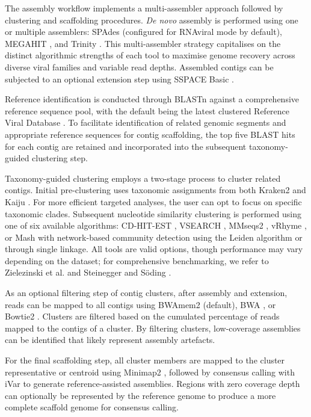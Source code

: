The assembly workflow implements a multi-assembler approach followed by clustering and scaffolding procedures. \textit{De novo} assembly is performed using one or multiple assemblers: SPAdes \cite{Meleshko2021-gb} (configured for RNAviral mode by default), MEGAHIT \cite{Li2016-sd}, and Trinity \cite{Grabherr2011-ef}. This multi-assembler strategy capitalises on the distinct algorithmic strengths of each tool to maximise genome recovery across diverse viral families and variable read depths. Assembled contigs can be subjected to an optional extension step using SSPACE Basic \cite{Boetzer2011-dh}.

Reference identification is conducted through BLASTn \cite{Altschul1990-sy} against a comprehensive reference sequence pool, with the default being the latest clustered Reference Viral Database \cite{Goodacre2018-dw}. To facilitate identification of related genomic segments and appropriate reference sequences for contig scaffolding, the top five BLAST hits for each contig are retained and incorporated into the subsequent taxonomy-guided clustering step.

Taxonomy-guided clustering employs a two-stage process to cluster related contigs. Initial pre-clustering uses taxonomic assignments from both Kraken2 \cite{Wood2019-jl} and Kaiju \cite{Menzel2016-tz}. For more efficient targeted analyses, the user can opt to focus on specific taxonomic clades. Subsequent nucleotide similarity clustering is performed using one of six available algorithms: CD-HIT-EST \cite{Li2006-nj}, VSEARCH \cite{Rognes2016-ju}, MMseqs2 \cite{Steinegger2017-ci}, vRhyme \cite{Kieft2022-km}, or Mash \cite{Ondov2019-bo} with network-based community detection using the Leiden algorithm \cite{Traag2019-yd} or through single linkage.  All tools are valid options, though performance may vary depending on the dataset; for comprehensive benchmarking, we refer to Zielezinski et al. \cite{Zielezinski2025-vl} and Steinegger and Söding \cite{Steinegger2017-ci}.

As an optional filtering step of contig clusters, after assembly and extension, reads can be mapped to all contigs using BWAmem2 \cite{Vasimuddin2019-rb} (default), BWA \cite{Li2013-pp}, or Bowtie2 \cite{Langmead2019-wx}. Clusters are filtered based on the cumulated percentage of reads mapped to the contigs of a cluster. By filtering clusters, low-coverage assemblies can be identified that likely represent assembly artefacts.

For the final scaffolding step, all cluster members are mapped to the cluster representative or centroid using Minimap2 \cite{Li2018-gi}, followed by consensus calling with iVar \cite{Grubaugh2019-xd} to generate reference-assisted assemblies. Regions with zero coverage depth can optionally be represented by the reference genome to produce a more complete scaffold genome for consensus calling.

